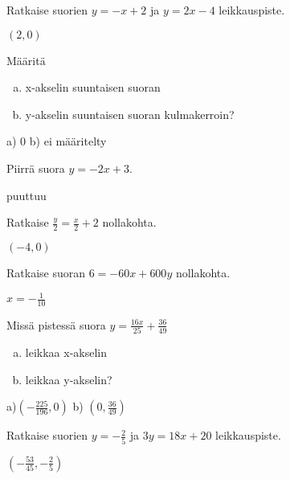 \begin{tehtavasivu}
\begin{tehtava}
Ratkaise suorien $y=-x+2$ ja $y=2x-4$ leikkauspiste.
\begin{vastaus}
$(2, 0)$
\end{vastaus}
\end{tehtava}

\begin{tehtava}
Määritä
\begin{enumerate}[a)]
\item x-akselin suuntaisen suoran
\item y-akselin suuntaisen suoran kulmakerroin?
\end{enumerate}
\begin{vastaus}
a) $0$ b) ei määritelty %
\end{vastaus}
\end{tehtava}

\begin{tehtava}
Piirrä suora $y=-2x+3$.
\begin{vastaus}
puuttuu
\end{vastaus}
\end{tehtava}

\begin{tehtava}
Ratkaise $\frac{y}{2}=\frac{x}{2}+2$ nollakohta.
\begin{vastaus}
$(-4, 0)$
\end{vastaus}
\end{tehtava}

\begin{tehtava}
Ratkaise suoran $6=-60x+600y$ nollakohta.
\begin{vastaus}
$x=-\frac{1}{10}$
\end{vastaus}
\end{tehtava}

\begin{tehtava}
Missä pistessä suora $y=\frac{16x}{25}+\frac{36}{49}$
\begin{enumerate}[a)]
\item leikkaa x-akselin
\item leikkaa y-akselin?
\end{enumerate}
\begin{vastaus}
a)$(-\frac{225}{196}, 0)$ b) $(0, \frac{36}{49})$
\end{vastaus}
\end{tehtava}

\begin{tehtava}
Ratkaise suorien $y=-\frac{2}{5}$ ja $3y=18x+20$ leikkauspiste.
\begin{vastaus}
$(-\frac{53}{45}, -\frac{2}{5})$
\end{vastaus}
\end{tehtava}


\end{tehtavasivu}
